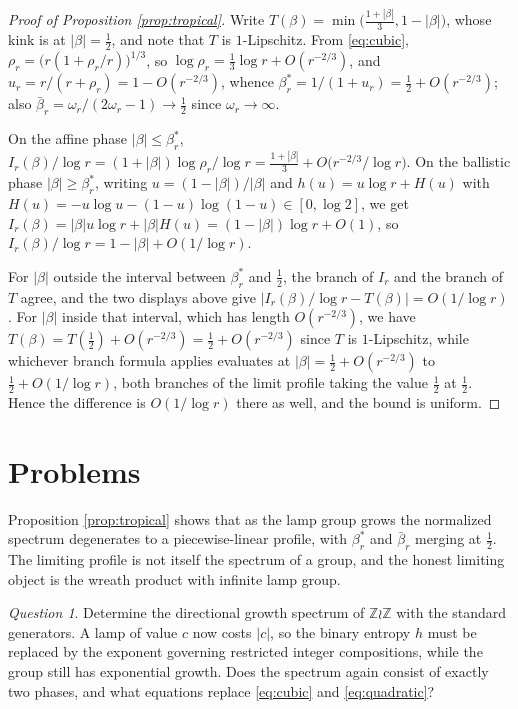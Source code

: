 \documentclass[11pt]{amsart}
\theoremstyle{definition}
\theoremstyle{remark}
\newtheorem{question}[theorem]{Question}
\newcommand{\Z}{\mathbb{Z}}
\begin{document}
\begin{proof}[Proof of Proposition \ref{prop:tropical}]
Write $T(\beta)=\min\big(\tfrac{1+|\beta|}3,1-|\beta|\big)$, whose kink is at $|\beta|=\tfrac12$, and note that $T$ is $1$-Lipschitz. From \eqref{eq:cubic}, $\rho_r=\big(r(1+\rho_r/r)\big)^{1/3}$, so $\log\rho_r=\tfrac13\log r+O(r^{-2/3})$, and $u_r=r/(r+\rho_r)=1-O(r^{-2/3})$, whence $\beta^{*}_r=1/(1+u_r)=\tfrac12+O(r^{-2/3})$; also $\bar\beta_r=\omega_r/(2\omega_r-1)\to\tfrac12$ since $\omega_r\to\infty$.

On the affine phase $|\beta|\le\beta^{*}_r$,
$I_r(\beta)/\log r=(1+|\beta|)\log\rho_r/\log r=\tfrac{1+|\beta|}3+O\big(r^{-2/3}/\log r\big)$.
On the ballistic phase $|\beta|\ge\beta^{*}_r$, writing $u=(1-|\beta|)/|\beta|$ and $h(u)=u\log r+H(u)$ with $H(u)=-u\log u-(1-u)\log(1-u)\in[0,\log2]$, we get $I_r(\beta)=|\beta|u\log r+|\beta|H(u)=(1-|\beta|)\log r+O(1)$, so $I_r(\beta)/\log r=1-|\beta|+O(1/\log r)$.

For $|\beta|$ outside the interval between $\beta^{*}_r$ and $\tfrac12$, the branch of $I_r$ and the branch of $T$ agree, and the two displays above give $|I_r(\beta)/\log r-T(\beta)|=O(1/\log r)$. For $|\beta|$ inside that interval, which has length $O(r^{-2/3})$, we have $T(\beta)=T(\tfrac12)+O(r^{-2/3})=\tfrac12+O(r^{-2/3})$ since $T$ is $1$-Lipschitz, while whichever branch formula applies evaluates at $|\beta|=\tfrac12+O(r^{-2/3})$ to $\tfrac12+O(1/\log r)$, both branches of the limit profile taking the value $\tfrac12$ at $\tfrac12$. Hence the difference is $O(1/\log r)$ there as well, and the bound is uniform.
\end{proof}

\section{Problems}\label{sec:questions}

Proposition \ref{prop:tropical} shows that as the lamp group grows the normalized spectrum degenerates to a piecewise-linear profile, with $\beta^{*}_r$ and $\bar\beta_r$ merging at $\tfrac12$. The limiting profile is not itself the spectrum of a group, and the honest limiting object is the wreath product with infinite lamp group.

\begin{question}\label{q:ZwrZ}
Determine the directional growth spectrum of $\Z\wr\Z$ with the standard generators. A lamp of value $c$ now costs $|c|$, so the binary entropy $h$ must be replaced by the exponent governing restricted integer compositions, while the group still has exponential growth. Does the spectrum again consist of exactly two phases, and what equations replace \eqref{eq:cubic} and \eqref{eq:quadratic}?
\end{question}
\end{document}
